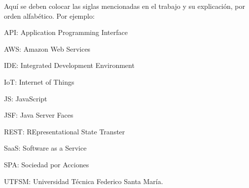 
Aquí se deben colocar las siglas mencionadas en el trabajo y su explicación, por orden alfabético. Por ejemplo: \\

{\setlength{\parskip}{0cm} %
API: Application Programming Interface

AWS: Amazon Web Services

IDE: Integrated Development Environment

IoT: Internet of Things

JS: JavaScript

JSF: Java Server Faces

REST: REpresentational State Transter

SaaS: Software as a Service

SPA: Sociedad por Acciones

UTFSM: Universidad Técnica Federico Santa María.
}